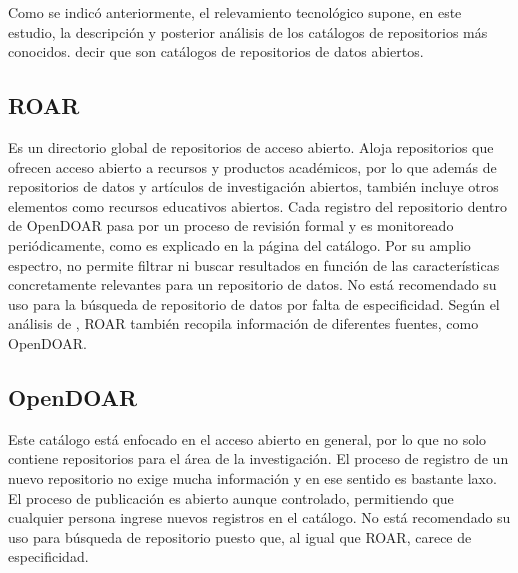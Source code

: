 \documentclass{article}
\begin{document}

Como se indicó anteriormente, el relevamiento tecnológico supone, en este estudio, la descripción y posterior análisis de los catálogos de repositorios más conocidos. decir que son catálogos de repositorios de datos abiertos.

\subsection{ROAR}

Es un directorio global de repositorios de acceso abierto. Aloja repositorios que ofrecen acceso abierto a recursos y productos académicos, por lo que además de repositorios de datos y artículos de investigación abiertos, también incluye otros elementos como recursos educativos abiertos.  
Cada registro del repositorio dentro de OpenDOAR pasa por un proceso de revisión formal y es monitoreado periódicamente, como es explicado en la página del catálogo.  
Por su amplio espectro, no permite filtrar ni buscar resultados en función de las características concretamente relevantes para un repositorio de datos.  
No está recomendado su uso para la búsqueda de repositorio de datos por falta de especificidad.  
Según el análisis de \cite{schabinger2023}, ROAR también recopila información de diferentes fuentes, como OpenDOAR.

\subsection{OpenDOAR}

Este catálogo está enfocado en el acceso abierto en general, por lo que no solo contiene repositorios para el área de la investigación.  
El proceso de registro de un nuevo repositorio no exige mucha información y en ese sentido es bastante laxo. El proceso de publicación es abierto aunque controlado, permitiendo que cualquier persona ingrese nuevos registros en el catálogo.  
No está recomendado su uso para búsqueda de repositorio puesto que, al igual que ROAR, carece de especificidad.
\end{document}
